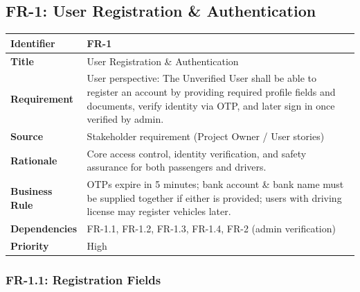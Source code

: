 \subsection{FR-1: User Registration \& Authentication}

\begin{longtable}{|p{3cm}|p{12cm}|}
\hline
\rowcolor{lightgray!30}
\textbf{Identifier} & FR-1 \\
\hline
\textbf{Title} & User Registration \& Authentication \\
\hline
\textbf{Requirement} & User perspective: The Unverified User shall be able to register an account by providing required profile fields and documents, verify identity via OTP, and later sign in once verified by admin. \\
\hline
\textbf{Source} & Stakeholder requirement (Project Owner / User stories) \\
\hline
\textbf{Rationale} & Core access control, identity verification, and safety assurance for both passengers and drivers. \\
\hline
\textbf{Business Rule} & OTPs expire in 5 minutes; bank account \& bank name must be supplied together if either is provided; users with driving license may register vehicles later. \\
\hline
\textbf{Dependencies} & FR-1.1, FR-1.2, FR-1.3, FR-1.4, FR-2 (admin verification) \\
\hline
\textbf{Priority} & High \\
\hline
\end{longtable}

\subsubsection{FR-1.1: Registration Fields}

